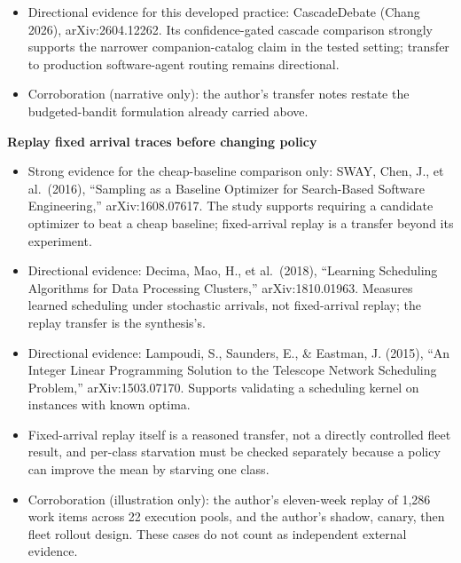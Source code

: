 \begin{itemize}
\item
  Directional evidence for this developed practice: CascadeDebate (Chang 2026), arXiv:2604.12262. Its confidence-gated cascade comparison strongly supports the narrower companion-catalog claim in the tested setting; transfer to production software-agent routing remains directional.
\item
  Corroboration (narrative only): the author's transfer notes restate the budgeted-bandit formulation already carried above.
\end{itemize}

\textbf{Replay fixed arrival traces before changing policy}

\begin{itemize}
\tightlist
\item
  Strong evidence for the cheap-baseline comparison only: SWAY, Chen, J., et al.~(2016), ``Sampling as a Baseline Optimizer for Search-Based Software Engineering,'' arXiv:1608.07617. The study supports requiring a candidate optimizer to beat a cheap baseline; fixed-arrival replay is a transfer beyond its experiment.
\item
  Directional evidence: Decima, Mao, H., et al.~(2018), ``Learning Scheduling Algorithms for Data Processing Clusters,'' arXiv:1810.01963. Measures learned scheduling under stochastic arrivals, not fixed-arrival replay; the replay transfer is the synthesis's.
\item
  Directional evidence: Lampoudi, S., Saunders, E., \& Eastman, J. (2015), ``An Integer Linear Programming Solution to the Telescope Network Scheduling Problem,'' arXiv:1503.07170. Supports validating a scheduling kernel on instances with known optima.
\item
  Fixed-arrival replay itself is a reasoned transfer, not a directly controlled fleet result, and per-class starvation must be checked separately because a policy can improve the mean by starving one class.
\item
  Corroboration (illustration only): the author's eleven-week replay of 1,286 work items across 22 execution pools, and the author's shadow, canary, then fleet rollout design. These cases do not count as independent external evidence.
\end{itemize}
